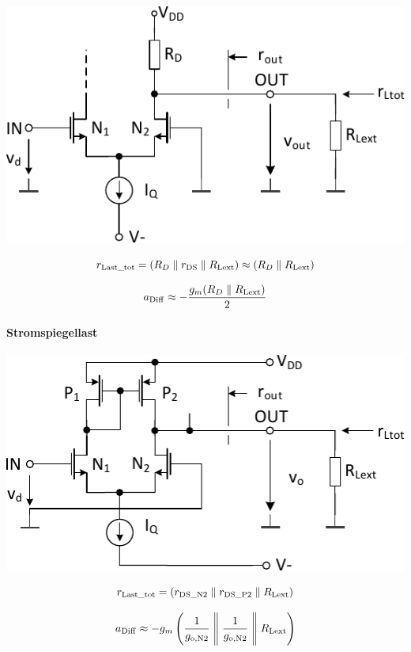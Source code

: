 \begin{minipage}[t]{0.45\columnwidth}
    \includegraphics[width=\columnwidth, align=t]{images/09_differenzstufe_kleinsignal_verstaerkung_widerstand.pdf}
\end{minipage}
\hfill
\begin{minipage}[t]{0.5\columnwidth}
    \[
        r_{\rm Last\_tot} = \left( R_D \parallel r_{\rm DS} \parallel R_{\rm Lext} \right) \approx \left( R_D \parallel R_{\rm Lext} \right) 
    \]

    \[
        a_{\rm Diff} \approx - \frac{g_m (R_D \parallel R_{\rm Lext})}{2}
    \]
\end{minipage}



\paragraph{Stromspiegellast}

\begin{minipage}[t]{0.45\columnwidth}
    \includegraphics[width=\columnwidth, align=t]{images/09_differenzstufe_kleinsignal_verstaerkung_stromspiegel.pdf}
\end{minipage}
\hfill
\begin{minipage}[t]{0.5\columnwidth}
    \[
        r_{\rm Last\_tot} =  \left( r_{\rm DS\_N2} \parallel r_{\rm DS\_P2} \parallel R_{\rm Lext} \right)
    \]

    \vspace{-0.2cm}

    \[
        a_{\rm Diff} \approx - g_m \left(\frac{1}{g_{\rm o, N2}} \Biggm\Vert \frac{1}{g_{\rm o, N2}} \Biggm\Vert R_{\rm Lext}\right)
    \]
\end{minipage}



